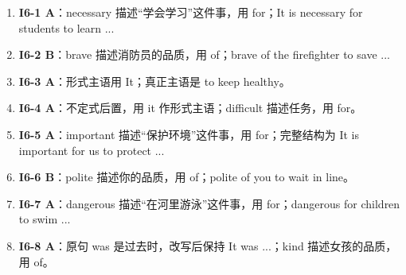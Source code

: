 \documentclass[11pt,a4paper]{ctexart}
\begin{document}
\begin{enumerate}[leftmargin=1.6em,itemsep=2pt]
\item \textbf{I6-1 A}：necessary 描述“学会学习”这件事，用 for；It is necessary for students to learn ...
\item \textbf{I6-2 B}：brave 描述消防员的品质，用 of；brave of the firefighter to save ...
\item \textbf{I6-3 A}：形式主语用 It；真正主语是 to keep healthy。
\item \textbf{I6-4 A}：不定式后置，用 it 作形式主语；difficult 描述任务，用 for。
\item \textbf{I6-5 A}：important 描述“保护环境”这件事，用 for；完整结构为 It is important for us to protect ...
\item \textbf{I6-6 B}：polite 描述你的品质，用 of；polite of you to wait in line。
\item \textbf{I6-7 A}：dangerous 描述“在河里游泳”这件事，用 for；dangerous for children to swim ...
\item \textbf{I6-8 A}：原句 was 是过去时，改写后保持 It was ...；kind 描述女孩的品质，用 of。
\end{enumerate}
\end{document}
